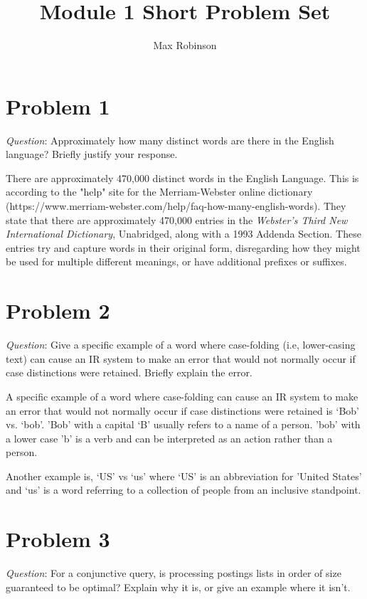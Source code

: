 \documentclass{article}
\begin{document}
\title{Module 1 Short Problem Set}
\author{Max Robinson}
\date{}
\maketitle

\section{Problem 1}
\textit{Question}: Approximately how many distinct words are there in the English language? Briefly justify your response.

There are approximately 470,000 distinct words in the English Language. This is according to the "help" site for the Merriam-Webster online dictionary (https://www.merriam-webster.com/help/faq-how-many-english-words). They state that there are approximately 470,000 entries in the \textit{Webster's Third New International Dictionary}, Unabridged, along with a 1993 Addenda Section. These entries try and capture words in their original form, disregarding how they might be used for multiple different meanings, or have additional prefixes or suffixes. 

\section{Problem 2}
\textit{Question}: Give a specific example of a word where case-folding (i.e, lower-casing text) can cause an IR system to make
an error that would not normally occur if case distinctions were retained. Briefly explain the error.

A specific example of a word where case-folding can cause an IR system to make an error that would not normally occur if case distinctions were retained is `Bob' vs. `bob'. 'Bob' with a capital `B' usually refers to a name of a person. 'bob' with a lower case 'b' is a verb and can be interpreted as an action rather than a person. 

Another example is, `US' vs `us' where `US' is an abbreviation for 'United States' and `us' is a word referring to a collection of people from an inclusive standpoint. 

\pagebreak
\section{Problem 3}
\textit{Question}: For a conjunctive query, is processing postings lists in order of size guaranteed to be optimal? Explain why it is, or give an example where it isn’t.
\end{document}
